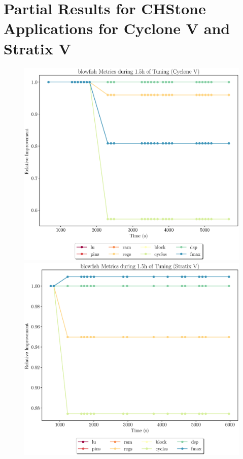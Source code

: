 \documentclass[12pt, a4paper]{article}
\begin{document}
\section*{Partial Results for CHStone Applications for Cyclone V and Stratix V}

\noindent

\begin{figure}[htpb]
    \centering
    \noindent
    \begin{minipage}{.48\textwidth}
        \centering
        \includegraphics[scale=.29]{blowfish_all_5400_chstone_CycloneV}
    \end{minipage}%
    \hfill
    \begin{minipage}{.48\textwidth}
        \centering
        \includegraphics[scale=.29]{blowfish_all_5400_chstone_StratixV}
    \end{minipage}%


\end{figure}
\end{document}
